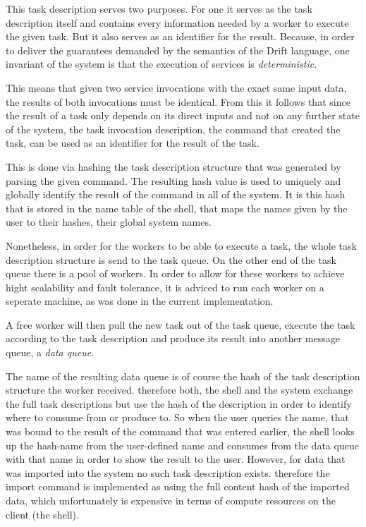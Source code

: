 This task description serves two purposes. For one it serves
as the task description itself and contains every information
needed by a worker to execute the given task. But it also serves
as an identifier for the result. Because, in order to deliver the
guarantees demanded by the semantics of the  Drift language,
one invariant of the system is that the execution of services is
\textit{deterministic}.

This means that given two service invocations with the exact same
input data, the results of both invocations must be identical.
From this it follows that since the result of a task only depends
on its direct inputs and not on any further state of the system,
the task invocation description, the command that created the
task, can be used as an identifier for the result of the task.

This is done via hashing the task description structure that was
generated by parsing the given command. The resulting hash value
is used to uniquely and globally identify the result of the command
in all of the system. It is this hash that is stored in the name
table of the shell, that maps the names given by the user to
their hashes, their global system names.
\newline

Nonetheless, in order for the workers to be able to execute a
task, the whole task description structure is send to the task
queue. On the other end of the task queue there is a pool of
workers. In order to allow for these workers to achieve hight
scalability and fault tolerance, it is adviced to run each worker
on a seperate machine, as was done in the current implementation.

A free worker will then pull the new task out of the task queue,
execute the task according to the task description and produce its
result into another message queue, a \textit{data queue}.

The name of the resulting data queue is of course the hash of the
task description structure the worker received. therefore both,
the shell and the system exchange the full task descriptions
but use the hash of the description in order to identify where
to consume from or produce to. So when the user queries the name,
that was bound to the result of the command that was entered
earlier, the shell looks up the hash-name from the user-defined
name and consumes from the data queue with that name in order to show
the result to the user. However, for data that was imported into
the system no such task description exists. therefore the import
command is implemented as using the full content hash of the imported
data, which unfortunately is expensive in terms of compute resources
on the client (the shell).
\newline

